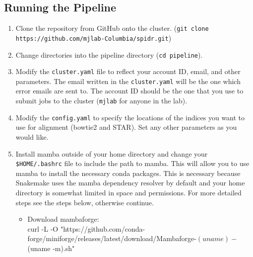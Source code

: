 \documentclass{article}
\begin{document}
    \subsection{Running the Pipeline}

    \begin{enumerate}
        \item Clone the repository from GitHub onto the cluster. (\texttt{git clone https://github.com/mjlab-Columbia/spidr.git})
        \item Change directories into the pipeline directory (\texttt{cd pipeline}).
        \item Modify the \texttt{cluster.yaml} file to reflect your account ID, email, and other parameters. The email written in the \texttt{cluster.yaml} will be the one which error emails are sent to. The account ID should be the one that you use to submit jobs to the cluster (\texttt{mjlab} for anyone in the lab).
        \item Modify the \texttt{config.yaml} to specify the locations of the indices you want to use for alignment (bowtie2 and STAR). Set any other parameters as you would like.
        \item Install mamba outside of your home directory and change your 
        \texttt{\$HOME/.bashrc} file to include the path to mamba. This will allow you to use mamba to install the necessary conda packages. This is necessary because Snakemake uses the mamba dependency resolver by default and your home directory is somewhat limited in space and permissions. For more detailed steps see the steps below, otherwise continue.
            \begin{itemize}
                \item Download mambaforge: \\
                curl -L -O "https://github.com/conda-forge/miniforge/releases/latest/download/Mambaforge-$(uname)-$(uname -m).sh"
    

\end{itemize}
\end{enumerate}
\end{document}
